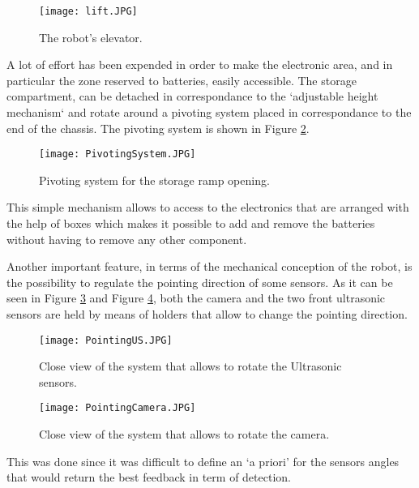 \begin{figure}[H]
 \centering
 \texttt{[image: lift.JPG]}
 \caption{The robot's elevator.}
\label{fig:lift}
\end{figure}

A lot of effort has been expended in order to make the electronic area, and in particular the zone reserved to batteries, easily accessible.
The storage compartment, can be detached in correspondance to the `adjustable height mechanism` and rotate around a pivoting system placed in correspondance to the end of the chassis.
The pivoting system is shown in Figure \ref{fig:PivotingSystem}.

\begin{figure}[H]
 \centering
 \texttt{[image: PivotingSystem.JPG]}
 \caption{Pivoting system for the storage ramp opening.}
\label{fig:PivotingSystem}
\end{figure}

This simple mechanism allows to access to the electronics that are arranged with the help of boxes which makes it possible to add and remove the batteries without having to remove any other component.

Another important feature, in terms of the mechanical conception of the robot, is the possibility to regulate the pointing direction of some sensors.
As it can be seen in Figure \ref{fig:PointingUS} and Figure \ref{fig:PointingCamera}, both the camera and the two front ultrasonic sensors are held by means of holders that allow to change the pointing direction.

\begin{figure}[H]
 \centering
 \texttt{[image: PointingUS.JPG]}
 \caption{Close view of the system that allows to rotate the Ultrasonic sensors.}
\label{fig:PointingUS}
\end{figure}

\begin{figure}[H]
 \centering
 \texttt{[image: PointingCamera.JPG]}
 \caption{Close view of the system that allows to rotate the camera.}
\label{fig:PointingCamera}
\end{figure}

This was done since it was difficult to define an `a priori' for the sensors angles  that would return the best feedback in term of detection.
